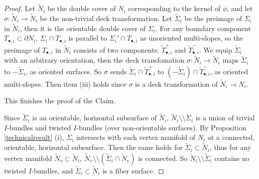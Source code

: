 \documentclass{amsart}
\numberwithin{equation}{section}
\theoremstyle{definition}
\begin{document}
\begin{proof}
Let $\tilde{N}_i$ be the double cover of $N_i$ corresponding to the kernel of $\phi$, and let $\sigma:\tilde{N}_i\to \tilde{N}_i$ be the non-trivial deck transformation. Let $\tilde{\Sigma}_i$ be the preimage of $\Sigma_i$ in $\tilde{N}_i$, then it is the orientable double cover of $\Sigma_i$. For any boundary component $T_{\bullet,i}\subset \partial N_i$, $\Sigma_i\cap T_{\bullet,i}$ is parallel to $\Sigma_i'\cap T_{\bullet,i}$ as unoriented multi-slopes, so the preimage of $T_{\bullet,i}$ in $\tilde{N}_i$ consists of two components: $\tilde{T}_{\bullet,i}^+$  and $\tilde{T}_{\bullet,i}^-$. We equip $\tilde{\Sigma}_i$ with an arbitrary orientation, then the deck transfomation $\sigma:\tilde{N}_i\to \tilde{N}_i$ maps $\tilde{\Sigma}_i$ to $-\tilde{\Sigma}_i$, as oriented surfaces. So $\sigma$ sends $\tilde{\Sigma}_i\cap \tilde{T}_{\bullet,i}^+$ to $(-\tilde{\Sigma}_i)\cap \tilde{T}_{\bullet,i}^-$, as oriented multi-slopes. Then item (iii) holds since $\sigma$ is a deck transformation of $\tilde{N}_i\to N_i$.

This finishes the proof of the Claim.

Since $\tilde{\Sigma}_i$ is an orientable, horizontal subsurface of $\tilde{N}_i$, $\tilde{N}_i\setminus \setminus \tilde{\Sigma}_i$ is a union of trivial $I$-bundles and twisted $I$-bundles (over non-orientable surfaces).
By Proposition \ref{technicalresult} (i), $\Sigma_i$ intersects with each vertex manifold of $N_i$ at a connected, orientable, horizontal subsurface. Then the same holds for $\tilde{\Sigma}_i\subset \tilde{N}_i$, thus for any vertex manifold $\tilde{N}_v\subset \tilde{N}_i$, $\tilde{N}_v\setminus \setminus (\tilde{\Sigma}_i\cap \tilde{N}_v)$ is connected. So $\tilde{N}_i\setminus \setminus \tilde{\Sigma}_i$ contains no twisted $I$-bundles, and $\tilde{\Sigma}_i\subset \tilde{N}_i$ is a fiber surface.



\end{proof}
\end{document}
